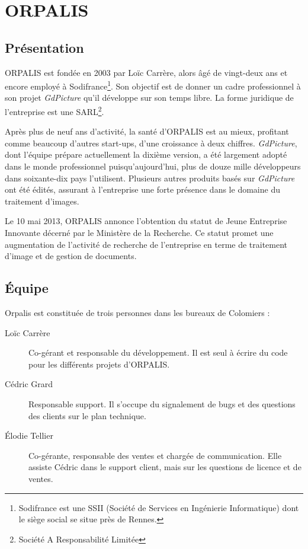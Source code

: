 \chapter{ORPALIS}

\section{Présentation}

ORPALIS est fondée en 2003 par Loïc Carrère, alors âgé de vingt-deux ans et encore employé à Sodifrance\footnote{Sodifrance est une SSII (Société de Services en Ingénierie Informatique) dont le siège social se situe près de Rennes.}. Son objectif est de donner un cadre professionnel à son projet \emph{GdPicture} qu'il développe sur son temps libre. La forme juridique de l'entreprise est une SARL\footnote{Société A Responsabilité Limitée}. 

Après plus de neuf ans d'activité, la santé d'ORPALIS est au mieux, profitant comme beaucoup d'autres start-ups, d'une croissance à deux chiffres. \emph{GdPicture}, dont l'équipe prépare actuellement la dixième version, a été largement adopté dans le monde professionnel puisqu'aujourd'hui, plus de douze mille développeurs dans soixante-dix pays l'utilisent. Plusieurs autres produits basés sur \emph{GdPicture} ont été édités, assurant à l'entreprise une forte présence dans le domaine du traitement d'images.

Le 10 mai 2013, ORPALIS annonce l'obtention du statut de Jeune Entreprise Innovante décerné par le Ministère de la Recherche. Ce statut promet une augmentation de l'activité de recherche de l'entreprise en terme de traitement d'image et de gestion de documents.

\section{Équipe}

Orpalis est constituée de trois personnes dans les bureaux de Colomiers :

\begin{description}
\item[Loïc Carrère] Co-gérant et responsable du développement. Il est seul à écrire du code pour les différents projets d'ORPALIS. 
\item[Cédric Grard] Responsable support. Il s'occupe du signalement de bugs et des questions des clients sur le plan technique.
\item[\'{E}lodie Tellier] Co-gérante, responsable des ventes et chargée de communication. Elle assiste Cédric dans le support client, mais sur les questions de licence et de ventes.
\end{description}


